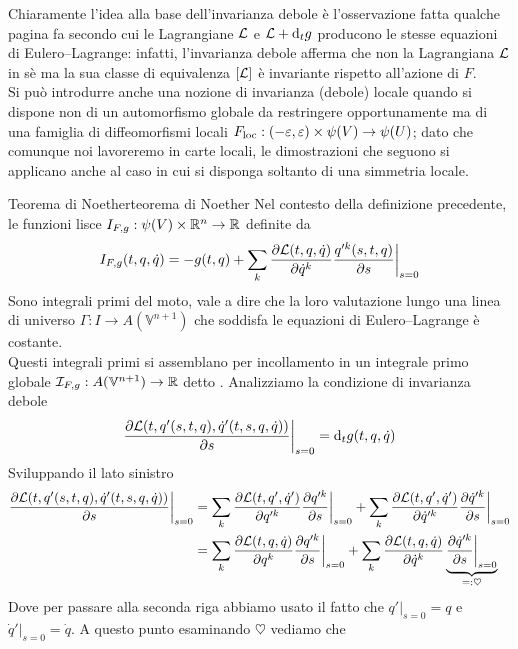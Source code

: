 \documentclass[openany]{book}
\renewcommand\V{\mathbb{V}}
\begin{document}
Chiaramente l'idea alla base dell'invarianza debole è l'osservazione fatta qualche pagina fa secondo cui le Lagrangiane $\mathcal{L}$ e $\mathcal{L}+\text{d}_t g$ producono le stesse equazioni di Eulero--Lagrange: infatti, l'invarianza debole afferma che non la Lagrangiana $\mathcal{L}$ in sè ma la sua classe di equivalenza $[\mathcal{L}]$ è invariante rispetto all'azione di $F$.\\
Si può introdurre anche una nozione di invarianza (debole) locale quando si dispone non di un automorfismo globale da restringere opportunamente ma di una famiglia di diffeomorfismi locali $F_{\text{loc}} : (-\varepsilon, \varepsilon)\times \psi(V)\to\psi(U)$; dato che comunque noi lavoreremo in carte locali, le dimostrazioni che seguono si applicano anche al caso in cui si disponga soltanto di una simmetria locale.

\begin{theorem}{Teorema di Noether}{teorema di Noether}
    Nel contesto della definizione precedente, le funzioni lisce $I_{F,g}:\psi(V)\times\mathbb{R}^n\to\mathbb{R}$ definite da
    \[ I_{F,g}(t,q,\dot q) = -g(t,q) + \sum_k \frac{\partial \mathcal{L}(t,q,\dot q)}{\partial \dot q^k}\frac{q'^k(s,t,q)}{\partial s}\bigg|_{s=0}  \]
    Sono integrali primi del moto, vale a dire che la loro valutazione lungo una linea di universo $\hat\Gamma:I\to A(\V^{n+1})$ che soddisfa le equazioni di Eulero--Lagrange è costante.\\
    Questi integrali primi si assemblano per incollamento in un integrale primo globale $\I_{F,g}:A(\V^{n+1})\to\R$ detto .
    \proof 
    Analizziamo la condizione di invarianza debole 
    \[ \frac{\partial \mathcal{L}(t, q'(s,t,q), \dot q'(t,s,q,\dot q))}{\partial s}\bigg|_{s=0} = \text{d}_t g(t,q,\dot q) \]
    Sviluppando il lato sinistro 
    \begin{align*}
        \frac{\partial \mathcal{L}(t, q'(s,t,q), \dot q'(t,s,q,\dot q))}{\partial s}\bigg|_{s=0} & = \sum_k \frac{\partial \mathcal{L}(t,q',\dot q' )}{\partial q'^k} \frac{\partial q'^k}{\partial s} \bigg|_{s=0} + \sum_k \frac{\partial \mathcal{L}(t,q',\dot q' )}{\partial \dot q'^k} \frac{\partial \dot q'^k}{\partial s} \bigg|_{s=0} \\ & = \sum_k \frac{\partial \mathcal{L}(t,q,\dot q )}{\partial q^k} \frac{\partial q'^k}{\partial s} \bigg|_{s=0} + \sum_k \frac{\partial \mathcal{L}(t,q,\dot q )}{\partial \dot q^k} \underbrace{\frac{\partial \dot q'^k}{\partial s} \bigg|_{s=0}}_{=: \heartsuit}
    \end{align*}
    Dove per passare alla seconda riga abbiamo usato il fatto che $q'|_{s=0} = q$ e $\dot q'|_{s=0} = \dot q$. A questo punto esaminando $\heartsuit$ vediamo che 

\end{theorem}
\end{document}
